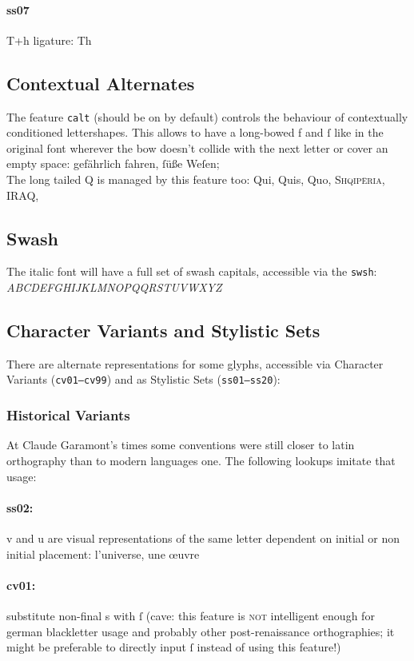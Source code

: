 \documentclass[pagesize,DIV14]{scrartcl}
\begin{document}
\paragraph*{ss07} T+h ligature:  Th

\subsection{Contextual Alternates}
The feature \texttt{calt} (should be on by default) controls the behaviour of contextually conditioned lettershapes. This allows to have a long-bowed f and ſ like in the original font wherever the bow doesn’t collide with the next letter or cover an empty space: gefährlich fahren, ſüße Weſen;\\
The long tailed Q is managed by this feature too: Qui, Quis, Quo, \textsc{Shqipëria}, IRAQ, 

\subsection{Swash}
The italic font will have a full set of swash capitals, accessible via the \texttt{swsh}: \\\textit{ABCDEFGHIJKLMNOPQQRSTUVWXYZ}

\subsection{Character Variants and Stylistic Sets}
There are alternate representations for some glyphs, accessible via Character Variants (\texttt{cv01–cv99}) and as Stylistic Sets (\texttt{ss01–ss20}):

\subsubsection{Historical Variants}

At Claude Garamont’s times some conventions were still closer to latin orthography than to modern languages one. The following lookups imitate that usage:
\paragraph{ss02:} v and u are visual representations of the same letter dependent on initial or non initial placement: {l’universe, une œuvre}
\paragraph*{cv01:} {substitute non-final s with ſ} (cave: this feature is \textsc{not} intelligent enough for german blackletter usage and probably other post-renaissance orthographies; it might be preferable to directly input ſ instead of using this feature!)
\end{document}
